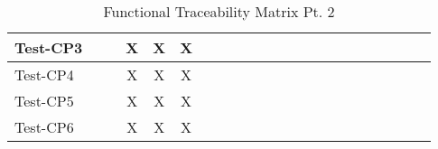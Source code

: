 \documentclass[12pt, titlepage]{article}
\begin{document}
\begin{landscape}
\begin{table}[H]
\begin{adjustwidth}{-0.1in}{-1in}
{\begin{tabular}{|c|c|c|c|c|c|c|c|c|c|c|c|c|c|c|c|c|c|c|c|c|c|}
\multicolumn{1}{|l|}{{Test-CP3}}  &             &              &      X       &     X         &   X          &             &             &             &              &              &             &             &              &             &              &                & & & & &\\ \hline
\multicolumn{1}{|l|}{{Test-CP4}}  &             &              &      X       &     X         &   X          &             &             &             &              &              &             &             &              &             &              &                & & & & &\\ \hline
\multicolumn{1}{|l|}{{Test-CP5}}  &             &              &      X       &     X         &   X          &             &             &             &              &              &             &             &              &             &              &                & & & & &\\ \hline
\multicolumn{1}{|l|}{{Test-CP6}}  &             &              &      X       &     X         &   X          &             &             &             &              &              &             &             &              &             &              &                & & & & &\\ \hline

\end{tabular}
}
\caption{Functional Traceability Matrix Pt. 2}
    \label{tab:matrix2}
\end{adjustwidth}
\end{table}


\end{landscape}
\end{document}
